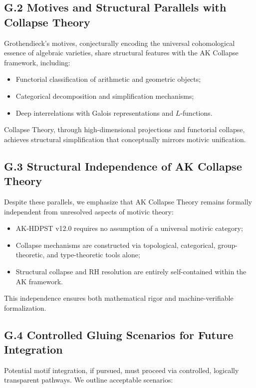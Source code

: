 \documentclass[11pt]{article}
\begin{document}
\subsection*{G.2 Motives and Structural Parallels with Collapse Theory}

Grothendieck's motives, conjecturally encoding the universal cohomological essence of algebraic varieties, share structural features with the AK Collapse framework, including:

\begin{itemize}
    \item Functorial classification of arithmetic and geometric objects;
    \item Categorical decomposition and simplification mechanisms;
    \item Deep interrelations with Galois representations and $L$-functions.
\end{itemize}

Collapse Theory, through high-dimensional projections and functorial collapse, achieves structural simplification that conceptually mirrors motivic unification.

\subsection*{G.3 Structural Independence of AK Collapse Theory}

Despite these parallels, we emphasize that AK Collapse Theory remains formally independent from unresolved aspects of motivic theory:

\begin{itemize}
    \item AK-HDPST v12.0 requires no assumption of a universal motivic category;
    \item Collapse mechanisms are constructed via topological, categorical, group-theoretic, and type-theoretic tools alone;
    \item Structural collapse and RH resolution are entirely self-contained within the AK framework.
\end{itemize}

This independence ensures both mathematical rigor and machine-verifiable formalization.

\subsection*{G.4 Controlled Gluing Scenarios for Future Integration}

Potential motif integration, if pursued, must proceed via controlled, logically transparent pathways. We outline acceptable scenarios:
\end{document}
